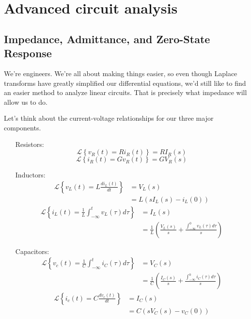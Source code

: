 \documentclass[nobib]{tufte-handout}
\begin{document}
\pagebreak

\section{Advanced circuit analysis}

\subsection{Impedance, Admittance, and Zero-State Response}
We're engineers. We're all about 
making things easier, so even 
though Laplace transforms have 
greatly simplified our differential 
equations, we'd still like to 
find an easier method to 
analyze linear circuits. That 
is precisely what impedance will 
allow us to do. 

Let's think about the current-voltage 
relationships for our three major 
components. 
\begin{itemize}
    \item[Resistors:] 
    \begin{equation}
        \mathcal{L}\left\{v_R(t) = Ri_R(t)\right\} = RI_R(s)
    \end{equation}
    \begin{equation}
        \mathcal{L}\left\{i_R(t) = Gv_R(t)\right\} = GV_R(s)
    \end{equation}
    \item[Inductors:] 
    \begin{align}
        \mathcal{L}\left\{v_L(t) = L\frac{di_L(t)}{dt}\right\} &= V_L(s) \\
        &= L\left(sI_L(s) - i_L(0)\right)
    \end{align}
    \begin{align}
        \mathcal{L}\left\{i_L(t) = \frac{1}{L} \int_{-\infty}^{t}v_L(\tau) d\tau\right\} &= I_L(s) \\
        &= \frac{1}{L} \left(\frac{V_L(s)}{s} + \frac{\int_{-\infty}^{0} v_L(\tau) d\tau}{s}\right)
    \end{align}
    \item[Capacitors:]
    \begin{align}
        \mathcal{L}\left\{v_c(t) = \frac{1}{C} \int_{-\infty}^{t}i_C(\tau) d\tau\right\} &= V_C(s) \\
        &= \frac{1}{C} \left( \frac{I_C(s)}{s} + \frac{\int_{-\infty}^{0} i_C(\tau) d\tau}{s}\right)
    \end{align}
    \begin{align}
        \mathcal{L}\left\{i_c(t) = C \frac{dv_c(t)}{dt}\right\} &= I_C(s) \\
        &= C\left(sV_C(s) - v_C(0)\right)
    \end{align}
\end{itemize}
\end{document}
